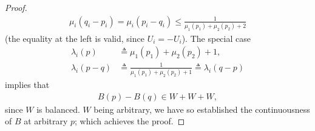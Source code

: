 \begin{proof}
%
\begin{align}
  \mu_i(q_i -p_i) = \mu_i(p_i -q_i) \leq \frac{1}{\mu_1(p_1)+\mu_2(p_2)+2} 
\end{align}
(the equality at the left is valid, since $U_i = -U_i$). %
The special case %
\begin{align}
  \lambda_i(p)   &\triangleq  \mu_1(p_1) + \mu_2(p_2) + 1, \\
  \lambda_i(p-q) &\triangleq  \frac{1}{\mu_1(p_1) + \mu_2(p_2) + 1} %
    \triangleq  \lambda_i(q-p) 
\end{align}
implies that %
%
\begin{align}
  B(p) - B(q)  \in W + W+ W, 
\end{align}    
%
since $W$ is balanced. %
%
$W$ being arbitrary, we have so established the continuousness of $B$ at %
arbitrary $p$; which achieves the proof.
\end{proof}
